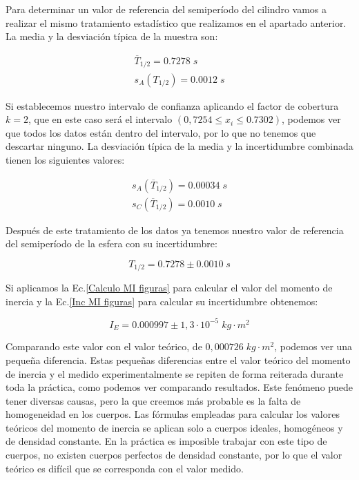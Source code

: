 \documentclass[a4paper,12pt,titlepage]{report}
\begin{document}
Para determinar un valor de referencia del semiperíodo del cilindro vamos a realizar el mismo tratamiento estadístico que realizamos en el apartado anterior. La media y la desviación típica de la muestra son:

\begin{equation}
    \begin{gathered}
        \overline{T}_{1/2} = 0.7278 \; s\\
        s_A(T_{1/2}) = 0.0012 \; s
    \end{gathered}
\end{equation}

Si establecemos nuestro intervalo de confianza aplicando el factor de cobertura $k=2$, que en este caso será el intervalo $(0,7254 \leq x_i \leq 0.7302)$, podemos ver que todos los datos están dentro del intervalo, por lo que no tenemos que descartar ninguno. La desviación típica de la media y la incertidumbre combinada tienen los siguientes valores:

\begin{equation}
    \begin{gathered}
        s_A(\overline{T}_{1/2}) = 0.00034 \; s\\
        s_C(\overline{T}_{1/2}) = 0.0010 \; s
    \end{gathered}
\end{equation}

Después de este tratamiento de los datos ya tenemos nuestro valor de referencia del semiperíodo de la esfera con su incertidumbre:

\begin{equation}
    T_{1/2} = 0.7278 \pm 0.0010 \; s
\end{equation}

Si aplicamos la Ec.\ref{Calculo MI figuras} para calcular el valor del momento de inercia y la Ec.\ref{Inc MI figuras} para calcular su incertidumbre obtenemos:

\begin{equation}
    I_E = 0.000997 \pm  1,3 \cdot 10^{-5} \;kg\cdot m^2
\end{equation}

Comparando este valor con el valor teórico, de $0,000726 \; kg \cdot m^2$, podemos ver una pequeña diferencia. Estas pequeñas diferencias entre el valor teórico del momento de inercia y el medido experimentalmente se repiten de forma reiterada durante toda la práctica, como podemos ver comparando resultados. Este fenómeno puede tener diversas causas, pero la que creemos más probable es la falta de homogeneidad en los cuerpos. Las fórmulas empleadas para calcular los valores teóricos del momento de inercia se aplican solo a cuerpos ideales, homogéneos y de densidad constante. En la práctica es imposible trabajar con este tipo de cuerpos, no existen cuerpos perfectos de densidad constante, por lo que el valor teórico es difícil que se corresponda con el valor medido.
\end{document}
